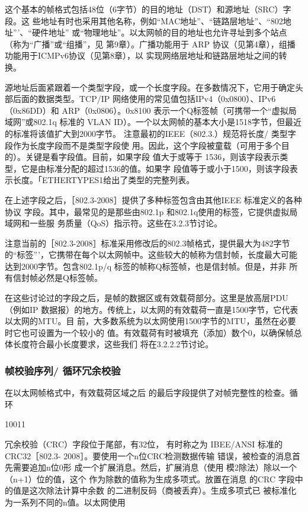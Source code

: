 这个基本的帧格式包括48位（6字节）的目的地址（DST）和源地址（SRC）字段。这
些地址有时也采用其他名称，例如“MAC地址”、“链路层地址”、“802地址”’、“硬件地址”
或“物理地址”。以太网帧的目的地址也允许寻址到多个站点（称为“广播”或“组播”，见
第9章）。广播功能用于 ARP 协议（见第4章），组播功能用于ICMPv6协议（见第8章），以
实现网络层地址和链路层地址之间的转换。

源地址后面紧跟着一个类型字段，或一个长度字段。在多数情况下，它用于确定头
部后面的数据类型。TCP/IP 网络使用的常见值包括IPv4（0x0800）、IPv6（0x86DD）和
ARP（0x0806）。0x8100 表示一个Q标签帧（可携带一个“虚拟局域网”或802.1q 标准的
VLAN ID）。一个以太网帧的基本大小是1518字节，但最近的标准将该值扩大到2000字节。
注意最初的IEEE（802.3.）规范将长度/ 类型字段作为长度字段而不是类型字段使
用。因此，这个字段被童载（可用于多个目的）。关键是看字段值。目前，如果字段
值大于或等于 1536，则该字段表示类型，它是由标准分配的超过1536的值。如果字
段值等于或小于1500，则该字段表示长度。「ETHERTYPES1给出了类型的完整列表。

在上述字段之后，［802.3-2008］提供了多种标签包含由其他IEEE 标准定义的各种协议
字段。其中，最常见的是那些由802.1p 和802.1q使用的标签，它提供虚拟局域网和一些服
务质量（QoS）指示符。这些在3.2.3节讨论。

注意当前的［802.3-2008］标准采用修改后的802.3帧格式，提供最大为482字节
的“标签”'，它携带在每个以太网帧中。这些较大的帧称为信封帧，长度最大可能
达到2000字节。包含802.1p/q 标签的帧称Q标签帧，也是信封帧。但是，并非
所有信封帧必然是Q标签帧。

在这些讨论过的字段之后，是帧的数据区或有效载荷部分。这里是放高层PDU（例如IP
数据报）的地方。传统上，以太网的有效载荷一直是1500字节，它代表以太网的MTU。目
前，大多数系统为以太网使用1500字节的MTU，虽然在必要时它也可设置为一个较小的
值。有效载荷有时被填充（添加）数个0，以确保帧总体长度符合最小长度要求，这些我们
将在3.2.2.2节讨论。

\subsubsection{帧校验序列/ 循环冗余校验}

在以太网帧格式中，有效载荷区域之后
的最后字段提供了对帧完整性的检查。循环

10011

冗余校验（CRC）字段位于尾部，有32位，
有时称之为 IBEE/ANSI 标准的CRC32［802.3-
2008］。要使用一个n位CRC检测数据传输
错误，被检查的消息首先需要追加n位0形
成一个扩展消息。然后，扩展消息（使用
模2除法）除以一个（n+1）位的值，这个
作为除数的值称为生成多项式。放置在消息
的CRC 字段中的值是这次除法计算中余数
的二进制反码（商被丢弃）。生成多项式已
被标准化为一系列不同的n值。以太网使用


